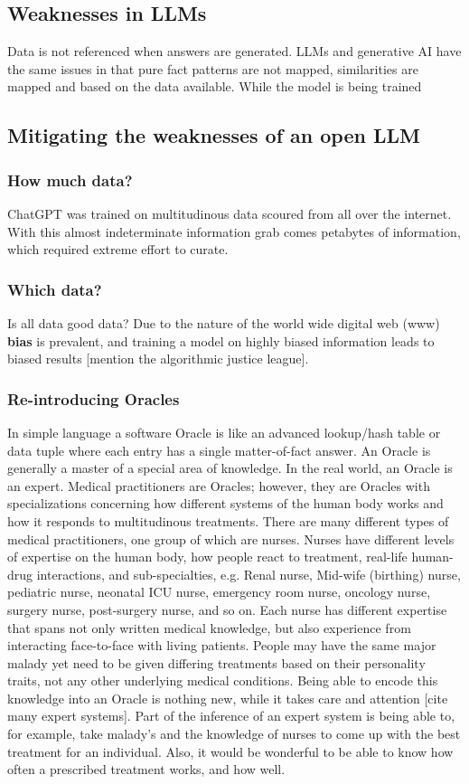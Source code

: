 \subsection{Weaknesses in LLMs}
Data is not referenced when answers are generated.
LLMs and generative AI have the same issues in that pure fact patterns are not mapped, similarities are mapped and based on the data available.
While the model is being trained

\subsection{Mitigating the weaknesses of an open LLM}
\subsubsection{How much data?}
ChatGPT was trained on multitudinous data scoured from all over the internet. 
With this almost indeterminate information grab comes petabytes of information, which required extreme effort to curate.
\subsubsection{Which data?}
Is all data good data?
Due to the nature of the world wide digital web (www) \textbf{bias} is prevalent, and training a model on highly biased information leads to biased results [mention the algorithmic justice league].
\subsubsection{Re-introducing Oracles}
In simple language a software Oracle is like an advanced lookup/hash table or data tuple where each entry has a single matter-of-fact answer.
An Oracle is generally a master of a special area of knowledge.
In the real world, an Oracle is an expert.
Medical practitioners are Oracles; however, they are Oracles with specializations concerning how different systems of the human body works and how it responds to multitudinous treatments.
There are many different types of medical practitioners, one group of which are nurses.
Nurses have different levels of expertise on the human body, how people react to treatment, real-life human-drug interactions, and sub-specialties, e.g. Renal nurse, Mid-wife (birthing) nurse, pediatric nurse, neonatal ICU nurse, emergency room nurse, oncology nurse, surgery nurse, post-surgery nurse, and so on.
Each nurse has different expertise that spans not only written medical knowledge, but also experience from interacting face-to-face with living patients.
People may have the same major malady yet need to be given differing treatments based on their personality traits, not any other underlying medical conditions.
Being able to encode this knowledge into an Oracle is nothing new, while it takes care and attention [cite many expert systems].
Part of the inference of an expert system is being able to, for example, take malady's and the knowledge of nurses to come up with the best treatment for an individual.
Also, it would be wonderful to be able to know how often a prescribed treatment works, and how well.

